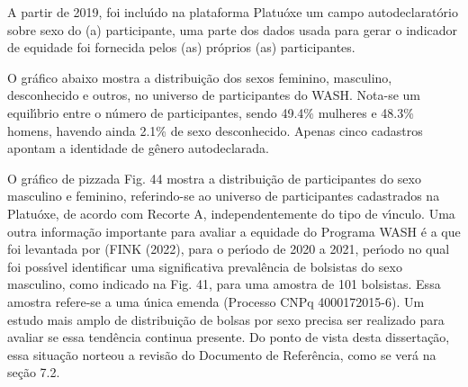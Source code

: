 \documentclass[
12pt,		%
openright,	%
twoside,  %
a4paper,			%
chapter=TITLE,		%
english,			%
french,				%
spanish,			%
brazil				%
]{USPSC-classe/USPSC}
\begin{document}
A partir de 2019, foi inclu\'{\i}do na plataforma Platu\'oxe um campo autodeclarat\'orio sobre sexo do (a) participante, uma parte dos dados usada para gerar o indicador de equidade foi fornecida pelos (as) pr\'oprios (as) participantes.

















O gr\'afico abaixo mostra a distribui\c{c}\~ao dos sexos feminino, masculino,  desconhecido e outros, no universo de participantes do WASH. Nota-se um equil\'{\i}brio entre o n\'umero de participantes, sendo 49.4\%  mulheres e 48.3\% homens, havendo ainda 2.1\% de sexo desconhecido. Apenas cinco cadastros apontam a identidade de g\^enero autodeclarada.

















O gr\'afico de \textquotedbl pizza\textquotedbl  da Fig. 44 mostra a distribui\c{c}\~ao de participantes do sexo masculino e feminino, referindo-se ao universo de participantes cadastrados na Platu\'oxe, de acordo com Recorte A, independentemente do tipo de v\'{\i}nculo. Uma outra informa\c{c}\~ao importante para avaliar a equidade do Programa  WASH \'e a que foi levantada por (FINK (2022), para o per\'{\i}odo de 2020 a 2021, per\'{\i}odo no qual foi poss\'{\i}vel identificar uma significativa preval\^encia de bolsistas do sexo masculino, como indicado na Fig. 41, para uma amostra de 101 bolsistas. Essa amostra refere-se a uma \'unica emenda (Processo CNPq 4000172015-6). Um estudo mais amplo de distribui\c{c}\~ao de bolsas por sexo precisa ser realizado para avaliar se essa tend\^encia continua presente. Do ponto de vista desta disserta\c{c}\~ao, essa situa\c{c}\~ao norteou a revis\~ao do Documento de Refer\^encia, como se ver\'a na se\c{c}\~ao 7.2.
\end{document}

